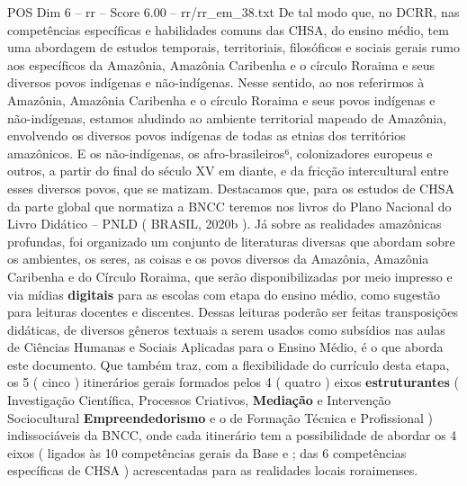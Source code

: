 \begin{textsample}{POS Dim 6 – rr – Score 6.00 – rr/rr\_em\_38.txt}
De tal modo que, no DCRR, nas competências específicas e habilidades comuns das CHSA, do ensino médio, tem uma abordagem de estudos temporais, territoriais, filosóficos e sociais gerais rumo aos específicos da Amazônia, Amazônia Caribenha e o círculo Roraima e seus diversos povos indígenas e não-indígenas.
Nesse sentido, ao nos referirmos à Amazônia, Amazônia Caribenha e o círculo Roraima e seus povos indígenas e não-indígenas, estamos aludindo ao ambiente territorial mapeado de Amazônia, envolvendo os diversos povos indígenas de todas as etnias dos territórios amazônicos.
E os não-indígenas, os afro-brasileiros⁶, colonizadores europeus e outros, a partir do final do século XV em diante, e da fricção intercultural entre esses diversos povos, que se matizam.
Destacamos que, para os estudos de CHSA da parte global que normatiza a BNCC teremos nos livros do Plano Nacional do Livro Didático – PNLD ( BRASIL, 2020b ).
Já sobre as realidades amazônicas profundas, foi organizado um conjunto de literaturas diversas que abordam sobre os ambientes, os seres, as coisas e os povos diversos da Amazônia, Amazônia Caribenha e do Círculo Roraima, que serão disponibilizadas por meio impresso e via mídias \textbf{digitais} para as escolas com etapa do ensino médio, como sugestão para leituras docentes e discentes.
Dessas leituras poderão ser feitas transposições didáticas, de diversos gêneros textuais a serem usados como subsídios nas aulas de Ciências Humanas e Sociais Aplicadas para o Ensino Médio, é o que aborda este documento.
Que também traz, com a flexibilidade do currículo desta etapa, os 5 ( cinco ) itinerários gerais formados pelos 4 ( quatro ) eixos \textbf{estruturantes} ( Investigação Científica, Processos Criativos, \textbf{Mediação} e Intervenção Sociocultural \textbf{Empreendedorismo} e o de Formação Técnica e Profissional ) indissociáveis da BNCC, onde cada itinerário tem a possibilidade de abordar os 4 eixos ( ligados às 10 competências gerais da Base e ; das 6 competências específicas de CHSA ) acrescentadas para as realidades locais roraimenses.

\end{textsample}
